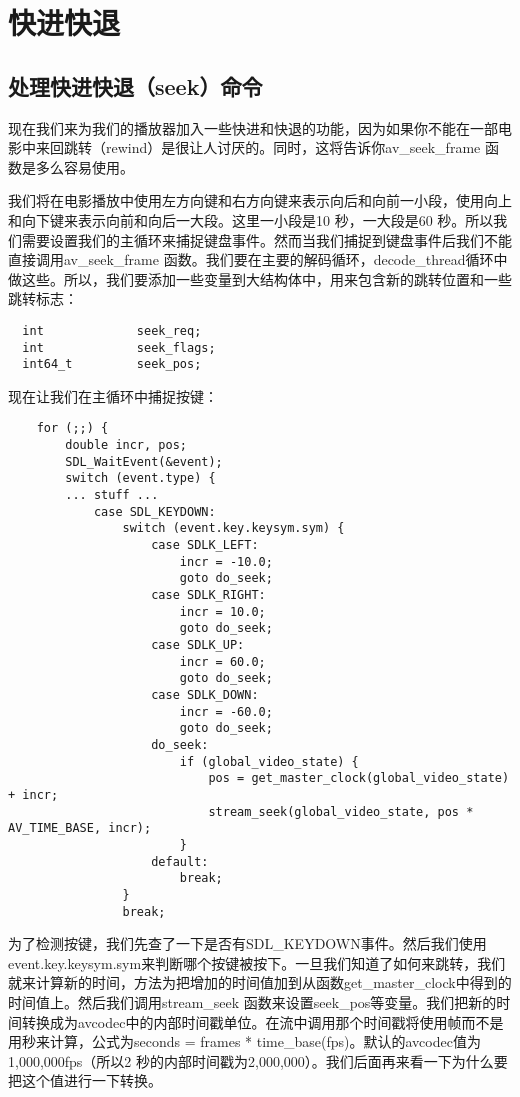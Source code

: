 ﻿\chapter{快进快退}
\label{ch7}
\section{处理快进快退（seek）命令}
现在我们来为我们的播放器加入一些快进和快退的功能，因为如果你不能在一部电影中来回跳转（rewind）是很让人讨厌的。同时，这将告诉你av_seek_frame 函数是多么容易使用。

我们将在电影播放中使用左方向键和右方向键来表示向后和向前一小段，使用向上和向下键来表示向前和向后一大段。这里一小段是10 秒，一大段是60 秒。所以我们需要设置我们的主循环来捕捉键盘事件。然而当我们捕捉到键盘事件后我们不能直接调用av_seek_frame 函数。我们要在主要的解码循环，decode_thread循环中做这些。所以，我们要添加一些变量到大结构体中，用来包含新的跳转位置和一些跳转标志：
\begin{lstlisting}
  int             seek_req;
  int             seek_flags;
  int64_t         seek_pos;
\end{lstlisting}

现在让我们在主循环中捕捉按键：

\begin{lstlisting}
    for (;;) {
        double incr, pos;
        SDL_WaitEvent(&event);
        switch (event.type) {
        ... stuff ...
            case SDL_KEYDOWN:
                switch (event.key.keysym.sym) {
                    case SDLK_LEFT:
                        incr = -10.0;
                        goto do_seek;
                    case SDLK_RIGHT:
                        incr = 10.0;
                        goto do_seek;
                    case SDLK_UP:
                        incr = 60.0;
                        goto do_seek;
                    case SDLK_DOWN:
                        incr = -60.0;
                        goto do_seek;
                    do_seek:
                        if (global_video_state) {
                            pos = get_master_clock(global_video_state) + incr;
                            stream_seek(global_video_state, pos * AV_TIME_BASE, incr);
                        }
                    default:
                        break;
                }
                break;
\end{lstlisting}

为了检测按键，我们先查了一下是否有SDL_KEYDOWN事件。然后我们使用event.key.keysym.sym来判断哪个按键被按下。一旦我们知道了如何来跳转，我们就来计算新的时间，方法为把增加的时间值加到从函数get_master_clock中得到的时间值上。然后我们调用stream_seek 函数来设置seek_pos等变量。我们把新的时间转换成为avcodec中的内部时间戳单位。在流中调用那个时间戳将使用帧而不是用秒来计算，公式为seconds = frames * time_base(fps)。默认的avcodec值为1,000,000fps（所以2 秒的内部时间戳为2,000,000）。我们后面再来看一下为什么要把这个值进行一下转换。

